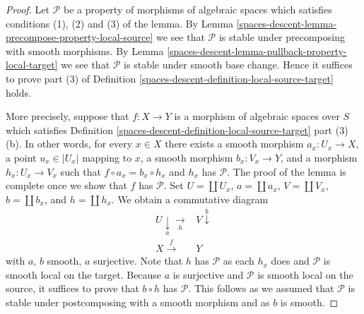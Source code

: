 \begin{proof}
Let $\mathcal{P}$ be a property of morphisms of algebraic spaces which
satisfies conditions (1), (2) and (3) of the lemma. By
Lemma \ref{spaces-descent-lemma-precompose-property-local-source}
we see that $\mathcal{P}$ is stable under precomposing with
smooth morphisms. By
Lemma \ref{spaces-descent-lemma-pullback-property-local-target}
we see that $\mathcal{P}$ is stable under smooth base change.
Hence it suffices to prove part (3) of
Definition \ref{spaces-descent-definition-local-source-target}
holds.

\medskip\noindent
More precisely, suppose that $f : X \to Y$ is a morphism
of algebraic spaces over $S$ which satisfies
Definition \ref{spaces-descent-definition-local-source-target} part (3)(b).
In other words, for every $x \in X$ there exists a smooth
morphism $a_x : U_x \to X$, a point $u_x \in |U_x|$ mapping to $x$,
a smooth morphism $b_x : V_x \to Y$, and a morphism $h_x : U_x \to V_x$
such that $f \circ a_x = b_x \circ h_x$ and $h_x$ has $\mathcal{P}$.
The proof of the lemma is complete once we show that $f$ has $\mathcal{P}$.
Set $U = \coprod U_x$, $a = \coprod a_x$, $V = \coprod V_x$,
$b = \coprod b_x$, and $h = \coprod h_x$. We obtain a
commutative diagram
$$
\begin{array}{cc}U \underset{a}{\downarrow}\underset{h}{\longrightarrow} & V \overset{b}{\downarrow} \\ X \overset{f}{\longrightarrow} & Y\end{array}
$$
with $a$, $b$ smooth, $a$ surjective. Note that $h$ has $\mathcal{P}$
as each $h_x$ does and $\mathcal{P}$ is smooth local on the target.
Because $a$ is surjective and $\mathcal{P}$ is smooth local on the source,
it suffices to prove that $b \circ h$ has $\mathcal{P}$.
This follows as we assumed that $\mathcal{P}$ is stable under
postcomposing with a smooth morphism and as $b$ is smooth.
\end{proof}

